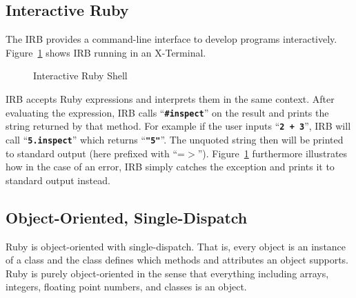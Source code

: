 \documentclass[12pt,a4paper,oneside,openright]{book}
\newcommand{\Eg}{For example }
\newcommand{\Ie}{That is, }
\newcommand{\fig}[1]{Figure~\ref{fig:#1}}
\newcommand{\lst}[1]{Listing~\ref{lst:#1}}
\newcommand{\code}[1]{``\texttt{\textbf{\textcolor{codegray}{\small{#1}}}}''}
\begin{document}
\begin{CJK}{UTF8}{}
\subsection{Interactive Ruby}\label{cha:irb}
The \ac{IRB} provides a command-line interface to develop programs interactively. \fig{irb} shows \ac{IRB} running in an X-Terminal.
\begin{figure}[htbp]
  \begin{center}
    \caption{Interactive Ruby Shell\label{fig:irb}}
  \end{center}
\end{figure}
\ac{IRB} accepts Ruby expressions and interprets them in the same context. After evaluating the expression, \ac{IRB} calls \code{\#inspect} on the result and prints the string returned by that method. \Eg if the user inputs \code{2 + 3}, \ac{IRB} will call \code{5.inspect} which returns \code{"5"}. The unquoted string then will be printed to standard output (here prefixed with ``=$>$''). \fig{irb} furthermore illustrates how in the case of an error, \ac{IRB} simply catches the exception and prints it to standard output instead.

\subsection{Object-Oriented, Single-Dispatch}
Ruby is object-oriented with single-dispatch. \Ie every object is an instance of a class and the class defines which methods and attributes an object supports. Ruby is purely object-oriented in the sense that everything including arrays, integers, floating point numbers, and classes is an object.


\end{CJK}
\end{document}
